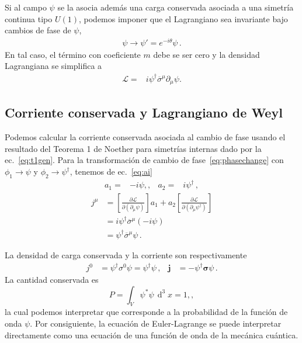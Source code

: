 \begin{frame}
Si al campo $\psi$ se la asocia además una carga conservada asociada a una simetría continua tipo $U(1)$, podemos imponer que el Lagrangiano sea invariante bajo cambios de fase de $\psi$, 
\begin{align}
  \label{eq:phasechange}
  \psi\to \psi'=e^{-i\theta}\psi\,.
\end{align}
En tal caso, el término con coeficiente $m$ debe se ser cero y la densidad Lagrangiana se simplifica a
\begin{align}
  \label{eq:masslesweylL}
   \mathcal{L}=&i{\psi}^{\dagger}\overline{\sigma}^\mu\partial_\mu\psi.
\end{align}
\end{frame}


\subsection{Corriente conservada y Lagrangiano de Weyl}
\label{sec:corriente-conservada}
\begin{frame}
  Podemos calcular la corriente conservada asociada al cambio de fase
  usando el resultado del Teorema 1 de Noether para simetrías internas  dado por la ec.~\eqref{eq:t1gen}. Para la transformación de cambio de fase~\eqref{eq:phasechange} con $\phi_1\to \psi$ y $\phi_2\to \psi^{\dagger}$, tenemos de ec.~\eqref{eq:ai}
  \begin{align}
    a_{1}=&-i\psi,,&      a_{2}=&i\psi^{\dagger}\,,
  \end{align}
\begin{align}
   j^\mu&=\left[\frac{\partial\mathcal{L}}{\partial\left(\partial_\mu\psi\right)}\right]a_1+a_2\left[\frac{\partial\mathcal{L}}{\partial\left(\partial_\mu\psi^\dagger\right)}\right]\nonumber\\
   &= i\psi^\dagger \overline{\sigma}^\mu(-i\psi)\nonumber\\
   &=\psi^\dagger \overline{\sigma}^\mu\psi\,.
\end{align}

La  densidad de carga conservada y la corriente son respectivamente
\begin{align}
  j^0&= \psi^\dagger \sigma^0\psi=\psi^{\dagger}\psi\,,&
  \boldsymbol{j}&=-\psi^{\dagger}\boldsymbol{\sigma} \psi\,.
\end{align}
La cantidad conservada es
\begin{equation}
  \label{eq:57}
P=  \int_V \psi^*\psi \,\operatorname{d}^3x=1,,
\end{equation}
la cual podemos interpretar que corresponde a la probabilidad de la función de onda $\psi$. Por consiguiente, la ecuación de Euler-Lagrange se puede interpretar directamente como una ecuación de una función de onda de la mecánica cuántica. 
\end{frame}
